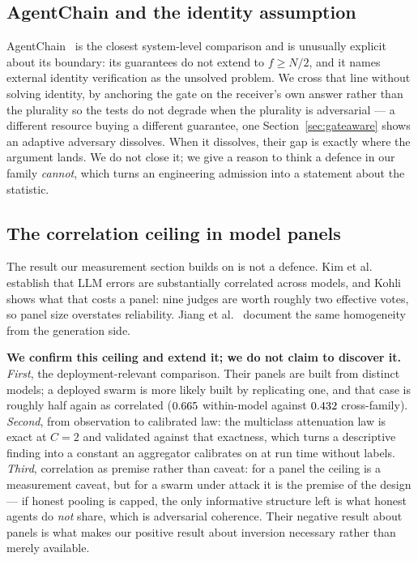\subsection{AgentChain and the identity assumption}

AgentChain~\cite{agentchain} is the closest system-level comparison and is
unusually explicit about its boundary: its guarantees do not extend to
$f \geq N/2$, and it names external identity verification as the unsolved
problem. We cross that line without solving identity, by anchoring the gate on
the receiver's own answer rather than the plurality so the tests do not degrade
when the plurality is adversarial --- a different resource buying a different
guarantee, one Section~\ref{sec:gateaware} shows an adaptive adversary dissolves.
When it dissolves, their gap is exactly where the argument lands. We do not close
it; we give a reason to think a defence in our family \emph{cannot}, which turns
an engineering admission into a statement about the statistic.

\subsection{The correlation ceiling in model panels}

The result our measurement section builds on is not a defence. Kim et
al.~\cite{judgecorr} establish that LLM errors are substantially correlated
across models, and Kohli~\cite{panelcorr} shows what that costs a panel: nine
judges are worth roughly two effective votes, so panel size overstates
reliability. Jiang et al.~\cite{hivemind} document the same homogeneity from the
generation side.

\textbf{We confirm this ceiling and extend it; we do not claim to discover it.}
\emph{First}, the deployment-relevant comparison. Their panels are built from
distinct models; a deployed swarm is more likely built by replicating one, and
that case is roughly half again as correlated ($0.665$ within-model
against $0.432$ cross-family). \emph{Second}, from observation to
calibrated law: the multiclass attenuation law is exact at $C=2$ and validated
against that exactness, which turns a descriptive finding into a constant an
aggregator calibrates on at run time without labels. \emph{Third}, correlation as
premise rather than caveat: for a panel the ceiling is a measurement caveat, but
for a swarm under attack it is the premise of the design --- if honest pooling is
capped, the only informative structure left is what honest agents do \emph{not}
share, which is adversarial coherence. Their negative result about panels is what
makes our positive result about inversion necessary rather than merely available.

